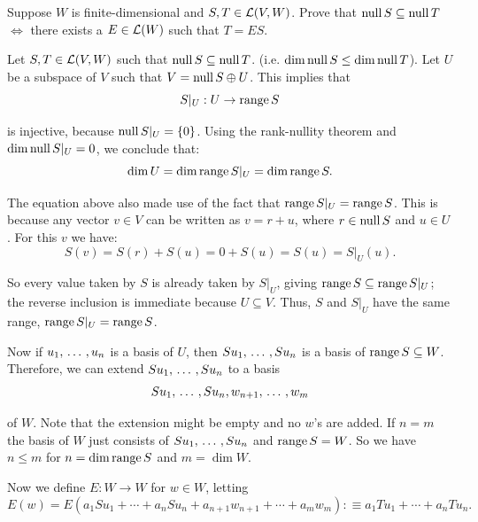 \begin{xrcs}
  Suppose $W$ is finite-dimensional and $S, T \in \mathcal{L} (V,W)$. Prove that $\operatorname{null} S \subseteq \operatorname{null} T$ $\iff$ there exists a $E \in \mathcal{L} (W)$ such that $T=ES$.

  \begin{xprf}
    \Rightarrowdirection Let $S, T \in \mathcal{L} (V,W)$ such that $\operatorname{null} S \subseteq \operatorname{null} T$. (i.e. $\dim \operatorname{null} S \leq \dim \operatorname{null} T$). Let $U$ be a subspace of $V$ such that $V = \operatorname{null} S \oplus U$. This implies that
    \begin{equation}
      S|_U : U \to \operatorname{range} S
    \end{equation}

   is injective, because $\operatorname{null} S|_U = \{0\}$. Using the rank-nullity theorem and $\dim \operatorname{null} S|_U = 0$, we conclude that:
   \begin{equation}
     \dim U = \dim \operatorname{range} S|_U = \dim \operatorname{range} S.
   \end{equation}

   The equation above also made use of the fact that $\operatorname{range} S|_U = \operatorname{range} S$. This is because any vector $v \in V$ can be written as $v = r + u$, where $r \in \operatorname{null} S$ and $u \in U$. For this $v$ we have:
   \begin{equation}
     S(v) = S(r) + S(u) = 0 + S(u) = S(u) = S|_U(u).
   \end{equation}

   So every value taken by $S$ is already taken by $S|_U$, giving $\operatorname{range} S \subseteq \operatorname{range} S|_U$; the reverse inclusion is immediate because $U \subseteq V$. Thus, $S$ and $S|_U$ have the same range, $\operatorname{range} S|_U = \operatorname{range} S$.

   Now if $u_1, {\, \ldots \,\,}, u_n$ is a basis of $U$, then $S u_1, {\, \ldots \,\,}, S u_n$ is a basis of $\operatorname{range} S \subseteq W$. Therefore, we can extend $S u_1, {\, \ldots \,\,}, S u_n$ to a basis
   \begin{equation}
     S u_1, {\, \ldots \,\,}, S u_n, w_{n+1}, {\, \ldots \,\,}, w_{m}
   \end{equation}

   of $W$. Note that the extension might be empty and no $w$'s are added. If $n = m$ the basis of $W$ just consists of $S u_1, {\, \ldots \,\,}, S u_n$ and $\operatorname{range} S = W$. So we have $n \leq m$ for $n = \dim \operatorname{range} S$ and $m = \dim W$.

   Now we define $E: W \to W$ for $w \in W$, letting
   \begin{equation}
     E(w) = E(a_1 Su_1 + \cdots + a_n Su_n + a_{n+1} w_{n+1} + \cdots + a_m w_m) :\equiv a_1 T u _1 + \cdots + a_n T u_n.
   \end{equation}


\end{xprf}
\end{xrcs}
